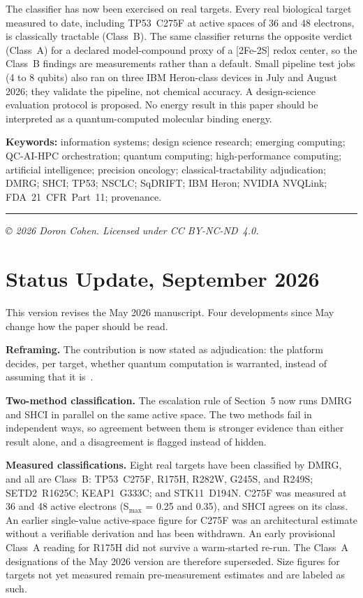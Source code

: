 \documentclass[11pt,letterpaper]{article}
\begin{document}
The classifier has now been exercised on real targets.  Every real biological target measured
to date, including TP53~C275F at active spaces of 36 and 48 electrons, is classically
tractable (Class~B).  The same classifier returns the opposite verdict (Class~A) for a
declared model-compound proxy of a [2Fe-2S] redox center, so the Class~B findings are
measurements rather than a default.  Small pipeline test jobs (4 to 8 qubits) also ran on
three IBM Heron-class devices in July and August 2026; they validate the pipeline, not
chemical accuracy.  A design-science evaluation protocol is proposed.  No energy result in
this paper should be interpreted as a quantum-computed molecular binding energy.

\smallskip
\noindent\textbf{Keywords:} information systems; design science research; emerging computing;
QC-AI-HPC orchestration; quantum computing; high-performance computing; artificial intelligence;
precision oncology; classical-tractability adjudication; DMRG; SHCI; TP53; NSCLC; SqDRIFT; IBM Heron; NVIDIA NVQLink; FDA~21~CFR~Part~11;
provenance.

\vfill
\noindent\rule{\textwidth}{0.4pt}
{\small\textit{\copyright{} 2026 Doron Cohen.  Licensed under CC BY-NC-ND~4.0.}}

\clearpage
\section*{Status Update, September 2026}

This version revises the May 2026 manuscript.  Four developments since May change how the
paper should be read.

\textbf{Reframing.}  The contribution is now stated as adjudication: the platform decides,
per target, whether quantum computation is warranted, instead of assuming that it
is~\cite{cohen2026proposal}.

\textbf{Two-method classification.}  The escalation rule of Section~5 now runs DMRG and SHCI
in parallel on the same active space.  The two methods fail in independent ways, so agreement
between them is stronger evidence than either result alone, and a disagreement is flagged
instead of hidden.

\textbf{Measured classifications.}  Eight real targets have been classified by DMRG, and all
are Class~B: TP53~C275F, R175H, R282W, G245S, and R249S; SETD2~R1625C; KEAP1~G333C; and
STK11~D194N.  C275F was measured at 36 and 48 active electrons (S$_\mathrm{max}$ = 0.25 and
0.35), and SHCI agrees on its class.  An earlier single-value active-space figure
for C275F was an architectural estimate without a verifiable derivation and has been
withdrawn.  An early provisional Class~A reading for R175H did not survive a warm-started
re-run.  The Class~A designations of the May 2026 version are therefore superseded.  Size
figures for targets not yet measured remain pre-measurement estimates and are labeled as such.
\end{document}
